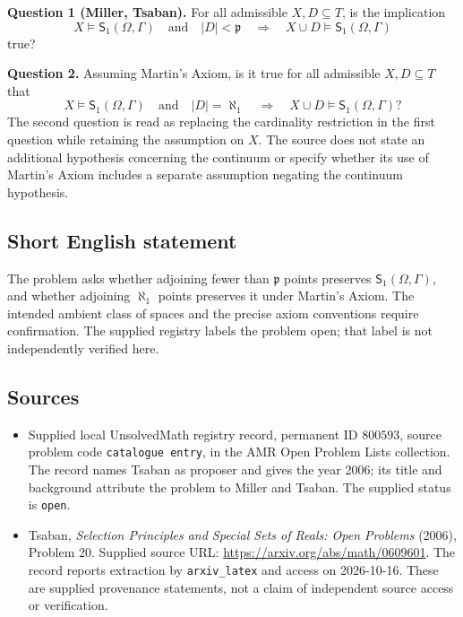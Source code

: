 \documentclass[11pt]{article}
\begin{document}
\textbf{Question 1 (Miller, Tsaban).} For all admissible \(X,D\subseteq T\), is the implication
\[
X\models\mathsf S_1(\Omega,\Gamma)\quad\text{and}\quad |D|<\mathfrak p
\quad\Longrightarrow\quad
X\cup D\models\mathsf S_1(\Omega,\Gamma)
\]
true?

\textbf{Question 2.} Assuming Martin's Axiom, is it true for all admissible \(X,D\subseteq T\) that
\[
X\models\mathsf S_1(\Omega,\Gamma)\quad\text{and}\quad |D|=\aleph_1
\quad\Longrightarrow\quad
X\cup D\models\mathsf S_1(\Omega,\Gamma)?
\]
The second question is read as replacing the cardinality restriction in the first question while retaining the assumption on \(X\). The source does not state an additional hypothesis concerning the continuum or specify whether its use of Martin's Axiom includes a separate assumption negating the continuum hypothesis.
\subsection{Short English statement}
The problem asks whether adjoining fewer than \(\mathfrak p\) points preserves \(\mathsf S_1(\Omega,\Gamma)\), and whether adjoining \(\aleph_1\) points preserves it under Martin's Axiom. The intended ambient class of spaces and the precise axiom conventions require confirmation. The supplied registry labels the problem open; that label is not independently verified here.
\subsection{Sources}
\begin{itemize}
\item Supplied local UnsolvedMath registry record, permanent ID \(800593\), source problem code \texttt{catalogue entry}, in the AMR Open Problem Lists collection. The record names Tsaban as proposer and gives the year 2006; its title and background attribute the problem to Miller and Tsaban. The supplied status is \texttt{open}.
\item Tsaban, \emph{Selection Principles and Special Sets of Reals: Open Problems} (2006), Problem 20. Supplied source URL: \url{https://arxiv.org/abs/math/0609601}. The record reports extraction by \texttt{arxiv\_latex} and access on 2026-10-16. These are supplied provenance statements, not a claim of independent source access or verification.
\end{itemize}
\end{document}
